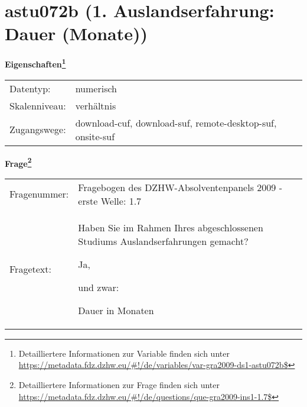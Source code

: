 
    \setcounter{footnote}{0}

    \vspace*{-1.8cm}
	\section{astu072b (1. Auslandserfahrung: Dauer (Monate))}
	\label{section:astu072b}



    \vspace*{0.5cm}
    \noindent\textbf{Eigenschaften\footnote{Detailliertere Informationen zur Variable finden sich unter
		\url{https://metadata.fdz.dzhw.eu/\#!/de/variables/var-gra2009-ds1-astu072b$}}}\\
	\begin{tabularx}{\hsize}{@{}lX}
	Datentyp: & numerisch \\
	Skalenniveau: & verhältnis \\
	Zugangswege: &
	  download-cuf, 
	  download-suf, 
	  remote-desktop-suf, 
	  onsite-suf
 \\
    \end{tabularx}



				\vspace*{0.5cm}
                \noindent\textbf{Frage\footnote{Detailliertere Informationen zur Frage finden sich unter
		              \url{https://metadata.fdz.dzhw.eu/\#!/de/questions/que-gra2009-ins1-1.7$}}}\\
				\begin{tabularx}{\hsize}{@{}lX}
					Fragenummer: &
					  Fragebogen des DZHW-Absolventenpanels 2009 - erste Welle:
					  1.7
 \\
					Fragetext: & Haben Sie im Rahmen Ihres abgeschlossenen Studiums Auslandserfahrungen gemacht?\par  Ja,\par  und zwar:\par  Dauer in Monaten \\
				\end{tabularx}





